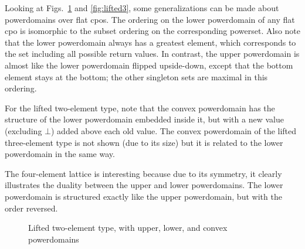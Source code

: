 Looking at Figs.~\ref{fig:lifted2} and \ref{fig:lifted3}, some generalizations can be made about powerdomains over flat cpos. The ordering on the lower powerdomain of any flat cpo is isomorphic to the subset ordering on the corresponding powerset. Also note that the lower powerdomain always has a greatest element, which corresponds to the set including all possible return values. In contrast, the upper powerdomain is almost like the lower powerdomain flipped upside-down, except that the bottom element stays at the bottom; the other singleton sets are maximal in this ordering.

For the lifted two-element type, note that the convex powerdomain has the structure of the lower powerdomain embedded inside it, but with a new value (excluding $\bot$) added above each old value. The convex powerdomain of the lifted three-element type is not shown (due to its size) but it is related to the lower powerdomain in the same way.

The four-element lattice is interesting because due to its symmetry, it clearly illustrates the duality between the upper and lower powerdomains. The lower powerdomain is structured exactly like the upper powerdomain, but with the order reversed.

\begin{figure}
\begin{centering}
\par\end{centering}

\caption{Lifted two-element type, with upper, lower, and convex powerdomains}
\label{fig:lifted2}
\end{figure}


